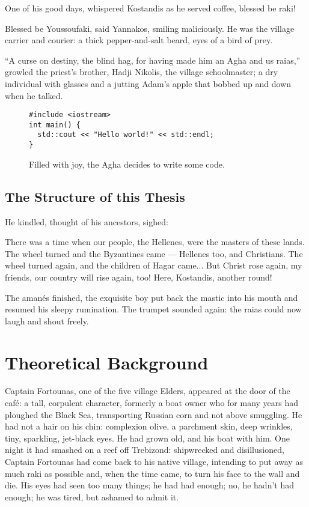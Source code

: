 \documentclass[diploma]{softlab-thesis}
\begin{document}
One of his good days, whispered Kostandis as he served coffee, blessed be
raki!

Blessed be Youssoufaki, said Yannakos, smiling maliciously. He was the
village carrier and courier: a thick pepper-and-salt beard, eyes of a bird
of prey.

``A curse on destiny, the blind hag, for having made him an Agha and us
raias,'' growled the priest’s brother, Hadji Nikolis, the village
schoolmaster; a dry individual with glasses and a jutting Adam’s apple that
bobbed up and down when he talked.

\begin{figure}[t]
\setlength\partopsep{-\topsep}%
\begin{verbatim}
#include <iostream>
int main() {
  std::cout << "Hello world!" << std::endl;
}
\end{verbatim}
\caption{Filled with joy, the Agha decides to write some code.%
  \label{fig:hello-english}}
\end{figure}


\section{The Structure of this Thesis}

He kindled, thought of his ancestors, sighed:

There was a time when our people, the Hellenes, were the masters of these
lands. The wheel turned and the Byzantines came --- Hellenes too, and
Christians. The wheel turned again, and the children of Hagar came... But
Christ rose again, my friends, our country will rise again, too! Here,
Kostandis, another round!

The amanés finished, the exquisite boy put back the mastic into his mouth
and resumed his sleepy rumination. The trumpet sounded again: the raias
could now laugh and shout freely.


\chapter{Theoretical Background}

Captain Fortounas, one of the five village Elders, appeared at the door of
the café: a tall, corpulent character, formerly a boat owner who for many
years had ploughed the Black Sea, transporting Russian corn and not above
smuggling. He had not a hair on his chin: complexion olive, a parchment
skin, deep wrinkles, tiny, sparkling, jet-black eyes. He had grown old, and
his boat with him. One night it had smashed on a reef off Trebizond:
shipwrecked and disillusioned, Captain Fortounas had come back to his native
village, intending to put away as much raki as possible and, when the time
came, to turn his face to the wall and die. His eyes had seen too many
things; he had had enough; no, he hadn’t had enough; he was tired, but
ashamed to admit it.
\end{document}
